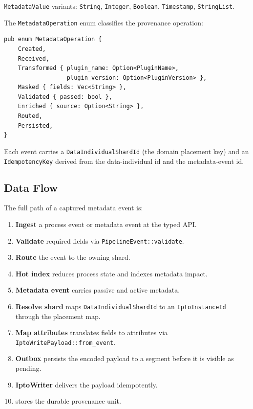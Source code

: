 \texttt{MetadataValue} variants: \texttt{String}, \texttt{Integer},
\texttt{Boolean}, \texttt{Timestamp}, \texttt{StringList}.

The \texttt{MetadataOperation} enum classifies the provenance operation:

\begin{lstlisting}
pub enum MetadataOperation {
    Created,
    Received,
    Transformed { plugin_name: Option<PluginName>,
                  plugin_version: Option<PluginVersion> },
    Masked { fields: Vec<String> },
    Validated { passed: bool },
    Enriched { source: Option<String> },
    Routed,
    Persisted,
}
\end{lstlisting}

Each event carries a \texttt{DataIndividualShardId} (the domain placement key)
and an \texttt{IdempotencyKey} derived from the data-individual id and the
metadata-event id.

\subsection{Data Flow}

The full path of a captured metadata event is:

\begin{enumerate}
\item \textbf{Ingest} a process event or metadata event at the typed API.
\item \textbf{Validate} required fields via \texttt{PipelineEvent::validate}.
\item \textbf{Route} the event to the owning \sitas{} shard.
\item \textbf{Hot index} reduces process state and indexes metadata impact.
\item \textbf{Metadata event} carries passive and active metadata.
\item \textbf{Resolve shard} maps \texttt{DataIndividualShardId} to an
  \texttt{IptoInstanceId} through the placement map.
\item \textbf{Map attributes} translates fields to \ipto{} attributes via
  \texttt{IptoWritePayload::from\_event}.
\item \textbf{Outbox} persists the encoded payload to a segment before it is
  visible as pending.
\item \textbf{IptoWriter} delivers the payload idempotently.
\item \textbf{\ipto{}} stores the durable provenance unit.
\end{enumerate}

